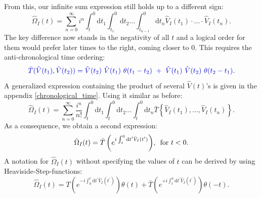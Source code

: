 \documentclass[12pt, titlepage]{article}
\begin{document}
From this, our infinite sum expression still holds up to a different sign:
\begin{equation}\label{Omega_anti_without_anti}
\hat{\Omega}_{I}(t) =
\sum\limits_{n=0}^{\infty} 
i^{n}
\int^{0}_{t}\mathrm{d}t_1\int^{0}_{t_{1}}\! \! \mathrm{d}t_2
 \ldots
 \int^{0}_{t_{n-1}}\! \! \mathrm{d}t_n
  \hat{V}_{I}(t_1)\cdot \ldots \cdot \hat{V}_{I}(t_n).
\end{equation}
The key difference now stands in the negativity of all $ t $ and a logical order for them would prefer later times to the right, coming closer to $ 0 $. This requires the anti-chronological time ordering:
 \begin{equation}\label{eq:anti-chron-time_ordering}
\textcolor[RGB]{0,0,204}{
\bar{T}(\hat{V}(t_1), \hat{V}(t_2))=\hat{V}(t_2)\ \hat{V}(t_1)\ \theta (t_1 -t_2)\ +\ \hat{V}(t_1)\  \hat{V}(t_2) \ \theta (t_2-t_1)
.}
\end{equation}
A generalized expression containing the product of several $ \hat{V}(t) $'s is given in the appendix \ref{chronological_time}.
Using it similar as before:
\begin{equation}
\hat{\Omega}_{I}(t) =
\sum\limits_{n=0}^{\infty} 
\frac{i^{n}}{n!}
\int^{0}_{t}\mathrm{d}t_1\int^{0}_{t}\! \! \mathrm{d}t_2
 \ldots
 \int^{0}_{t}\! \! \mathrm{d}t_n
 \bar{T}\left\lbrace \hat{V}_{I}(t_1), \ldots , \hat{V}_{I}(t_n)\right\rbrace .
\end{equation}
As a consequence, we obtain a second expression:\begin{equation}\label{eq:Omega_I_Chron1_0<}
\hat{\Omega}_{I}(t)
= \bar{T}\left( e^{i\int^{0}_{t}\mathrm{d}t^{\prime} \hat{V}_{I}(t^{\prime})} \right)
	\! ,\text{\enskip for  }  t<0 
	.
\end{equation}
A notation for $ \hat{\Omega}_{I}(t) $ without specifying the values of $ t $ can be derived by using Heaviside-Step-functions:
\begin{equation}\label{Omega_i_complete}
\hat{\Omega}_{I}(t)
=T\left( e^{-i\int_{0}^{t}\mathrm{d}t^{\prime} \hat{V}_{I}(t^{\prime})} \right)
\theta(t)
+
 \bar{T}\left( e^{+i\int_{t}^{0}\mathrm{d}t^{\prime} \hat{V}_{I}(t^{\prime})} \right)
 \theta(-t)
 .
\end{equation}
\end{document}

